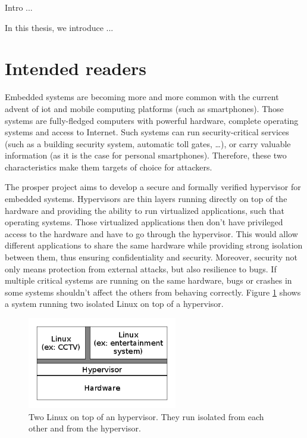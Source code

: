 \documentclass{kththesis}
\begin{document}
Intro ...

In this thesis, we introduce ...

\section{Intended readers}






















Embedded systems are becoming more and more common with the current advent of \Gls{iot} and mobile computing platforms (such as smartphones). Those systems are fully-fledged computers with powerful hardware, complete operating systems and access to Internet. Such systems can run security-critical services (such as a building security system, automatic toll gates, \dots), or carry valuable information (as it is the case for personal smartphones). Therefore, these two characteristics make them targets of choice for attackers.

The \gls{prosper} project \cite{noauthor_prosper:_nodate} aims to develop a secure and formally verified hypervisor for embedded systems. Hypervisors are thin layers running directly on top of the hardware and providing the ability to run virtualized applications, such that operating systems. Those virtualized applications then don't have privileged access to the hardware and have to go through the hypervisor. This would allow different applications to share the same hardware while providing strong isolation between them, thus ensuring confidentiality and security. Moreover, security not only means protection from external attacks, but also resilience to bugs. If multiple critical systems are running on the same hardware, bugs or crashes in some systems shouldn't affect the others from behaving correctly. Figure \ref{figure-hypervisor-simple} shows a system running two isolated Linux on top of a hypervisor.

\begin{figure}
	\includegraphics[height=4cm]{figures/figure-hypervisor-simple.png}
	\centering
	\caption{Two Linux on top of an hypervisor. They run isolated from each other and from the hypervisor.}
	\label{figure-hypervisor-simple}
\end{figure}
\end{document}
